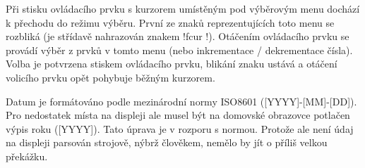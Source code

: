 Při stisku ovládacího prvku s kurzorem umístěným pod výběrovým menu dochází
k přechodu do režimu výběru. První ze znaků reprezentujících toto menu se
rozbliká (je střídavě nahrazován znakem !{fcur} !). Otáčením
ovládacího prvku se provádí výběr z prvků v tomto menu (nebo inkrementace /
dekrementace čísla). Volba je potvrzena stiskem ovládacího prvku, blikání znaku
ustává a otáčení volicího prvku opět pohybuje běžným kurzorem.

Datum je formátováno podle mezinárodní normy ISO8601 ([YYYY]-[MM]-[DD]).
Pro nedostatek místa na displeji ale musel být na domovské obrazovce potlačen
výpis roku ([YYYY]). Tato úprava je v rozporu s normou. Protože ale není údaj
na displeji parsován strojově, nýbrž člověkem, nemělo by jít o příliš velkou
překážku.

\begingroup
